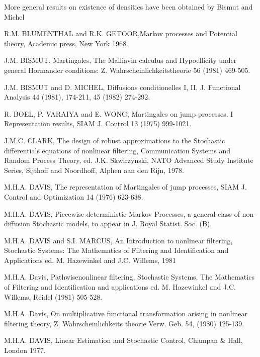   More general results on existence of densities have been obtained by
  Bismut and Michel \cite{key3} 

\begin{thebibliography}{99}
 {R.M. BLUMENTHAL and R.K. GETOOR},\pageoriginale  Markov
  processes and Potential theory, Academic press, New York 1968.  


 {J.M. BISMUT,  Martingales},  The
  Malliavin calculus and Hypoellicity under general Hormander
  conditions: Z. Wahrscheinlichkeitstheorie 56 (1981) 469-505. 

 {J.M. BISMUT and D. MICHEL}, Diffusions
  conditionelles I, II,  J. Functional Analysis 44 (1981),
  174-211, 45 (1982) 274-292. 

 {R. BOEL, P. VARAIYA and E. WONG}, Martingales on
  jump processes. I Representation results, SIAM J. Control
  13 (1975) 999-1021. 

 {J.M.C. CLARK}, The design of robust
  approximations to the Stochastic differentials equations of
  nonlinear filtering, Communication Systems and Random Process
  Theory, ed. J.K. Skwirzynski, NATO  Advanced Study Institute Series,
  Sijthoff and Noordhoff, Alphen aan den Rijn, 1978. 

 {M.H.A. DAVIS}, The representation of Martingales
  of jump processes, SIAM J. Control and Optimization 14
  (1976) 623-638.  

 {M.H.A. DAVIS}, Piecewise-deterministic Markov
  Processes, a general class of non-diffusion Stochastic models, to
  appear in J. Royal Statist. Soc. (B). 

 {M.H.A. DAVIS and S.I. MARCUS}, An Introduction
  to nonlinear filtering, Stochastic Systems: The Mathematics of
  Filtering and Identification and Applications ed. M. Hazewinkel and
  J.C. Willems, 1981 

 {M.H.A. Davis}, Pathwise\pageoriginale nonlinear filtering,
  Stochastic Systems,  The Mathematics of Filtering and Identification
  and applications ed. M. Hazewinkel and J.C. Willems, Reidel
  (1981) 505-528.  

 {M.H.A. Davis}, On multiplicative functional
  transformation arising in nonlinear filtering theory,
  Z. Wahrscheinlichkeits theorie Verw. Geb. 54, (1980) 125-139. 

 {M.H.A. DAVIS}, Linear Estimation and Stochastic
  Control, Champan  \& Hall, London 1977. 


\end{thebibliography}
